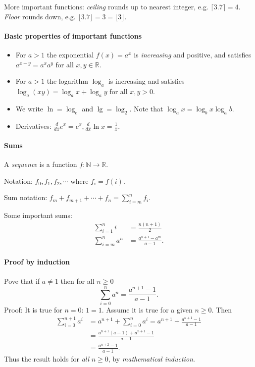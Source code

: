 More important functions: \emph{ceiling} rounds up to nearest integer, e.g. $\lceil 3.7 \rceil = 4$. \emph{Floor} rounds down, e.g. $\lfloor 3.7 \rfloor= 3 = \lfloor 3 \rfloor$.

\paragraph{Basic properties of important functions}
\begin{itemize}
\item For $a>1$ the exponential $f(x) = a^x$ is \emph{increasing} and positive, and satisfies $a^{x+y} = a^x a^y$ for all $x,y\in \mathbb{R}$.
\item For $a>1$ the logarithm $\log_a$ is increasing and satisfies $\log_a(xy) = \log_a x + \log_a y$ for all $x,y>0$.
\item We write $\ln = \log_e$ and $\lg = \log_2$. Note that $\log_a x = \log_b x \log_a b$.
\item Derivatives: $\frac{d}{dx} e^x = e^x, \frac{d}{dx} \ln x = \frac{1}{x}$.
\end{itemize}


\paragraph{Sums}

A \emph{sequence} is a function $f:\mathbb{N} \to \mathbb{R}$. 

Notation: $f_0, f_1, f_2, \cdots$ where $f_i = f(i)$.

Sum notation: $f_m+f_{m+1}+\cdots +f_n = \sum_{i=m}^n f_i$.

Some important sums: 
\begin{align*}
\sum_{i=1}^n i & = \frac{n(n+1)}{2} \\
\sum_{i=m}^n a^n&  = \frac{a^{n+1}-a^m}{a-1}.
\end{align*}




\paragraph{Proof by induction}

\begin{Example}
Pove that if $a\neq 1$ then for all  $n\geq 0$
$$
\sum_{i=0}^n a^n = \frac{a^{n+1} - 1}{a - 1}.
$$
Proof: It is true for $n=0$: $1 = 1$. Assume it is true for a given  $n\geq 0$. Then
\begin{align*}
\sum_{i=0}^{n+1} a^i & = a^{n+1} + \sum_{i=0}^n a^i 
= a^{n+1} + \frac{a^{n+1} - 1}{a-1} \\
& = \frac{a^{n+1} (a - 1) + a^{n+1} - 1}{a-1}\\
& = \frac{a^{n+2} - 1}{a-1}.
\end{align*}
Thus the result holds for \emph{all} $n\geq 0$, by \emph{mathematical induction}.
\end{Example}



